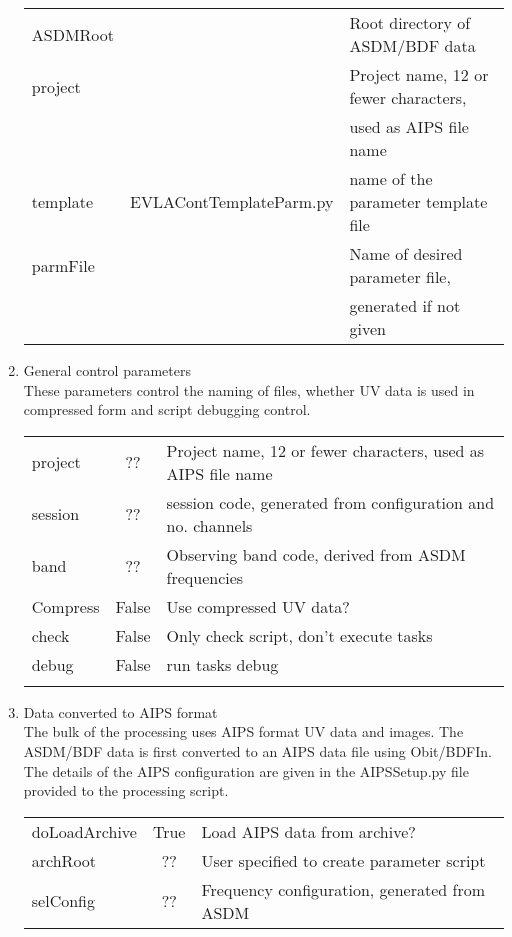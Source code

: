 \documentclass[11pt]{article}
\begin{document}
\begin{enumerate}
\begin{center}
\begin{tabular}{|l|c|l|}
\hline
ASDMRoot & & Root directory of ASDM/BDF data\\
project  & & Project name, 12 or fewer characters, \\
 & & used as AIPS file name \\
template & EVLAContTemplateParm.py & name of the parameter template
file\\
parmFile &  & Name of desired parameter file, \\
 & & generated if not given\\
\hline
\end{tabular}
\end{center}
%
\item General control parameters\\
These parameters control the naming of files, whether UV data is used
in compressed form and script debugging control.
\begin{center}
\begin{tabular}{|l|c|l|}
\hline
project  & ?? &  Project name, 12 or fewer characters,  used as AIPS file name\\
 session & ?? &  session code, generated from configuration and no. channels\\
 band  & ?? &  Observing band code, derived from ASDM frequencies\\
 Compress & False &  Use compressed UV data?\\
 check & False &  Only check script, don't execute tasks\\
 debug & False &  run tasks debug\\
  &  &  \\
\hline
\end{tabular}
\end{center}
%
\item Data converted to AIPS format\\
The bulk of the processing uses AIPS format UV data and images.
The ASDM/BDF data is first converted to an AIPS data file using Obit/BDFIn.
The details of the AIPS configuration are given in the AIPSSetup.py
file provided to the processing script.
\begin{center}
\begin{tabular}{|l|c|l|}
\hline
doLoadArchive  & True & Load AIPS data from archive? \\
archRoot  & ?? &  User specified to create parameter script\\
selConfig  & ?? &  Frequency configuration, generated from ASDM\\

\end{tabular}
\end{center}
\end{enumerate}
\end{document}
